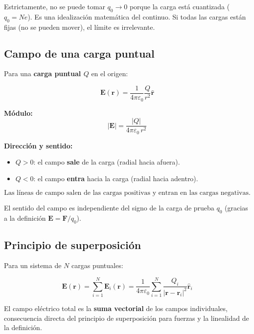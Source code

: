 \documentclass[12pt,a4paper]{article}
\begin{document}
\begin{warnbox}
  Estrictamente, no se puede tomar $q_0 \to 0$ porque la carga está
  cuantizada ($q_0 = Ne$). Es una idealización matemática del continuo.
  Si todas las cargas están fijas (no se pueden mover), el límite es
  irrelevante.
\end{warnbox}

\subsection{Campo de una carga puntual}

Para una \textbf{carga puntual $Q$} en el origen:

\[
\mathbf{E}(\mathbf{r}) =
\frac{1}{4\pi\varepsilon_0} \frac{Q}{r^{2}} \hat{\mathbf{r}}
\]

\textbf{Módulo:}
\[
|\mathbf{E}| = \frac{|Q|}{4\pi\varepsilon_0 \, r^{2}}
\]

\textbf{Dirección y sentido:}
\begin{itemize}[nosep]
  \item $Q > 0$: el campo \textbf{sale} de la carga (radial hacia
        afuera).
  \item $Q < 0$: el campo \textbf{entra} hacia la carga (radial hacia
        adentro).
\end{itemize}

\begin{keybox}
  \[
  \boxed{\text{Las líneas de campo salen de las cargas positivas
         y entran en las cargas negativas.}}
  \]
\end{keybox}

El sentido del campo es independiente del signo de la carga de prueba
$q_0$ (gracias a la definición $\mathbf{E} = \mathbf{F}/q_0$).



\subsection{Principio de superposición}

Para un sistema de $N$ cargas puntuales:

\[
\mathbf{E}(\mathbf{r}) = \sum_{i=1}^{N} \mathbf{E}_i(\mathbf{r})
= \frac{1}{4\pi\varepsilon_0}
  \sum_{i=1}^{N} \frac{Q_i}{|\mathbf{r} - \mathbf{r}_i|^{2}}
  \hat{\mathbf{r}}_i
\]

El campo eléctrico total es la \textbf{suma vectorial} de los campos
individuales, consecuencia directa del principio de superposición para
fuerzas y la linealidad de la definición.
\end{document}
